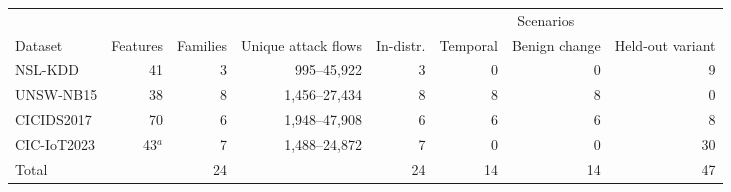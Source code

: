 \begin{tabular}{lrrrrrrr}
\toprule
 & & & & \multicolumn{4}{c}{Scenarios} \\ \cmidrule(lr){5-8}
Dataset & Features & Families & Unique attack flows & In-distr. & Temporal & Benign change & Held-out variant \\
\midrule
NSL-KDD & 41 & 3 & 995--45,922 & 3 & 0 & 0 & 9 \\
UNSW-NB15 & 38 & 8 & 1,456--27,434 & 8 & 8 & 8 & 0 \\
CICIDS2017 & 70 & 6 & 1,948--47,908 & 6 & 6 & 6 & 8 \\
CIC-IoT2023 & 43$^{a}$ & 7 & 1,488--24,872 & 7 & 0 & 0 & 30 \\
\midrule
Total & & 24 & & 24 & 14 & 14 & 47 \\
\bottomrule
\end{tabular}
